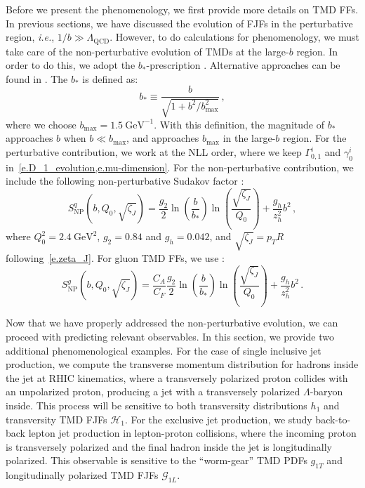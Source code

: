 \documentclass[a4paper, 11 pt]{article}
\begin{document}
Before we present the phenomenology, we first provide more details on TMD FFs. In previous sections, we have discussed the evolution of FJFs in the perturbative region, \textit{i.e.}, $1 / b \gg \Lambda _{\mathrm{QCD}}$.
However, to do calculations for phenomenology, we must take care of the non-perturbative evolution of TMDs at the large-$b$ region.
In order to do this, we adopt the $b_*$-prescription \cite{Collins:1984kg}. Alternative approaches can be found in \cite{Kulesza:2002rh, Qiu:2000hf, Catani:2015vma, Ebert:2016gcn, Monni:2016ktx}. The $b_*$ is defined as:
\begin{equation}
b_* \equiv \frac{b}{\sqrt{1 + b^2 / b_{\max}^2}}
\, ,
\end{equation}
where we choose $b_{\max} = 1.5~\mathrm{GeV}^{-1}$.
With this definition, the magnitude of $b_*$ approaches $b$ when $b \ll b_{\max}$, and approaches $b_{\max}$ in the large-$b$ region. For the perturbative contribution, we work at the NLL order, where we keep $\Gamma _{0, 1}^i$ and $\gamma_0^i$ in~\cref{e.D_1_evolution,e.mu-dimension}.
For the non-perturbative contribution, we include the following non-perturbative Sudakov factor \cite{Sun:2014dqm, Echevarria:2020hpy}:
\begin{equation}
\label{e.S_NP_q}
S_{\mathrm{NP}}^q(b, Q_0, \sqrt{\zeta_J})
=
\frac{g_2}{2} \ln(\frac{b}{b_*}) \ln(\frac{\sqrt{\zeta_J}}{Q_0}) + \frac{g_h}{z_h^2} b^2
\, ,
\end{equation}
where $Q_0^2 = 2.4~\mathrm{GeV}^2$, $g_2 = 0.84$ and $g_h = 0.042$, and $\sqrt{\zeta_J} = p_T R$ following~\cref{e.zeta_J}. For gluon TMD FFs, we use \cite{Kang:2017glf}:
\begin{equation}
\label{e.S_NP_g}
S_{\mathrm{NP}}^g(b, Q_0, \sqrt{\zeta_J})
=
\frac{C_A}{C_F} \frac{g_2}{2} \ln(\frac{b}{b_*}) \ln(\frac{\sqrt{\zeta_J}}{Q_0}) + \frac{g_h}{z_h^2} b^2
\, .
\end{equation}

Now that we have properly addressed the non-perturbative evolution, we can proceed with predicting relevant observables. In this section, we provide two additional phenomenological examples. For the case of single inclusive jet production, we compute the transverse momentum distribution for hadrons inside the jet at RHIC kinematics, where a transversely polarized proton collides with an unpolarized proton, producing a jet with a transversely polarized $\Lambda$-baryon inside. This process will be sensitive to both transversity distributions $h_1$ and transversity TMD FJFs $\mathcal{H}_1$. For the exclusive jet production, we study back-to-back lepton jet production in lepton-proton collisions, where the incoming proton is transversely polarized and the final hadron inside the jet is longitudinally polarized. This observable is sensitive to the ``worm-gear'' TMD PDFs $g_{1T}$ and longitudinally polarized TMD FJFs $\mathcal{G}_{1L}$. 
\end{document}
